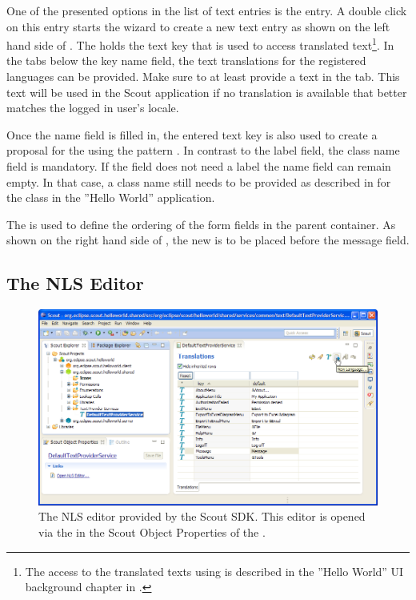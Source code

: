 \documentclass[a4paper,10pt,twoside]{book}
\begin{document}
One of the presented options in the list of text entries is the  entry. 
A double click on this entry starts the wizard to create a new text entry as shown on the left hand side of . 
The  holds the text key that is used to access translated text\footnote{
The access to the translated texts using  is described in the ''Hello World'' UI background chapter in . 
}.
In the tabs below the key name field, the text translations for the registered languages can be provided. 
Make sure to at least provide a text in the  tab. 
This text will be used in the Scout application if no translation is available that better matches the logged in user's locale. 

Once the name field is filled in, the entered text key is also used to create a proposal for the  using the pattern . 
In contrast to the label field, the class name field is mandatory. 
If the field does not need a label the name field can remain empty. 
In that case, a class name still needs to be provided as described in  for the  class in the ''Hello World'' application. 

The  is used to define the ordering of the form fields in the parent container. 
As shown on the right hand side of , the new  is to be placed before the message field. 

\subsection{The NLS Editor}

\begin{figure}
\includegraphics[width=14cm]{sdk_nls_editor.png} 
\caption{The NLS editor provided by the Scout SDK. This editor is opened via the  in the Scout Object Properties of the .
}
\end{figure}
\end{document}
